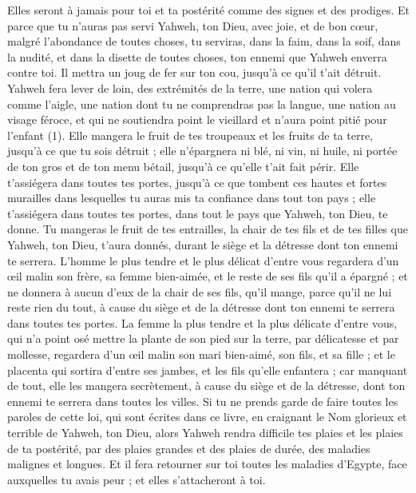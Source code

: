 \begin{multicols}{2}
Elles seront à jamais pour toi et ta postérité comme des signes et des prodiges.
Et parce que tu n'auras pas servi Yahweh, ton Dieu, avec joie, et de bon cœur, malgré l'abondance de toutes choses,
tu serviras, dans la faim, dans la soif, dans la nudité, et dans la disette de toutes choses, ton ennemi que Yahweh enverra contre toi. Il mettra un joug de fer sur ton cou, jusqu'à ce qu'il t'ait détruit.
Yahweh fera lever de loin, des extrémités de la terre, une nation qui volera comme l'aigle, une nation dont tu ne comprendras pas la langue,
une nation au visage féroce, et qui ne soutiendra point le vieillard et n’aura point pitié pour l'enfant (1).
Elle mangera le fruit de tes troupeaux et les fruits de ta terre, jusqu'à ce que tu sois détruit ; elle n’épargnera ni blé, ni vin, ni huile, ni portée de ton gros et de ton menu bétail, jusqu'à ce qu'elle t'ait fait périr.
Elle t'assiégera dans toutes tes portes, jusqu'à ce que tombent ces hautes et fortes murailles dans lesquelles tu auras mis ta confiance dans tout ton pays ; elle t’assiégera dans toutes tes portes, dans tout le pays que Yahweh, ton Dieu, te donne.
Tu mangeras le fruit de tes entrailles, la chair de tes fils et de tes filles que Yahweh, ton Dieu, t'aura donnés, durant le siège et la détresse dont ton ennemi te serrera.
L'homme le plus tendre et le plus délicat d'entre vous regardera d'un œil malin son frère, sa femme bien-aimée, et le reste de ses fils qu'il a épargné ;
et ne donnera à aucun d'eux de la chair de ses fils, qu’il mange, parce qu'il ne lui reste rien du tout, à cause du siège et de la détresse dont ton ennemi te serrera dans toutes tes portes.
La femme la plus tendre et la plus délicate d'entre vous, qui n'a point osé mettre la plante de son pied sur la terre, par délicatesse et par mollesse, regardera d'un œil malin son mari bien-aimé, son fils, et sa fille ;
et le placenta qui sortira d'entre ses jambes, et les fils qu'elle enfantera ; car manquant de tout, elle les mangera secrètement, à cause du siège et de la détresse, dont ton ennemi te serrera dans toutes les villes.
Si tu ne prends garde de faire toutes les paroles de cette loi, qui sont écrites dans ce livre, en craignant le Nom glorieux et terrible de Yahweh, ton Dieu,
alors Yahweh rendra difficile tes plaies et les plaies de ta postérité, par des plaies grandes et des plaies de durée, des maladies malignes et longues.
Et il fera retourner sur toi toutes les maladies d'Egypte, face auxquelles tu avais peur ; et elles s'attacheront à toi.

\end{multicols}
